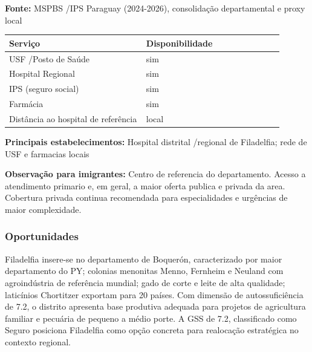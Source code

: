 \textbf{Fonte:} MSPBS /\allowbreak  IPS Paraguay (2024-2026), consolidação
departamental e proxy local

{\def\LTcaptype{none} %
\begin{longtable}{@{}>{\raggedright\arraybackslash}p{0.45\linewidth} >{\raggedright\arraybackslash}p{0.45\linewidth}@{}}
\toprule\noalign{}
Serviço & Disponibilidade \\
\midrule\noalign{}
\endhead
\bottomrule\noalign{}
\endlastfoot
USF /\allowbreak  Posto de Saúde & sim \\
Hospital Regional & sim \\
IPS (seguro social) & sim \\
Farmácia & sim \\
Distância ao hospital de referência & local \\
\end{longtable}
}

\textbf{Principais estabelecimentos:} Hospital distrital /\allowbreak  regional de
Filadelfia; rede de USF e farmacias locais

\textbf{Observação para imigrantes:} Centro de referencia do
departamento. Acesso a atendimento primario e, em geral, a maior oferta
publica e privada da area. Cobertura privada continua recomendada para
especialidades e urgências de maior complexidade.
\newpage

\subsubsection*{Oportunidades}\label{oport-filadelfia-1604}
Filadelfia insere-se no departamento de Boquerón, caracterizado por maior departamento do PY; colonias menonitas Menno, Fernheim e Neuland com agroindústria de referência mundial; gado de corte e leite de alta qualidade; laticínios Chortitzer exportam para 20 países. Com dimensão de autossuficiência de 7.2, o distrito apresenta base produtiva adequada para projetos de agricultura familiar e pecuária de pequeno a médio porte. A GSS de 7.2, classificado como Seguro posiciona Filadelfia como opção concreta para realocação estratégica no contexto regional.

